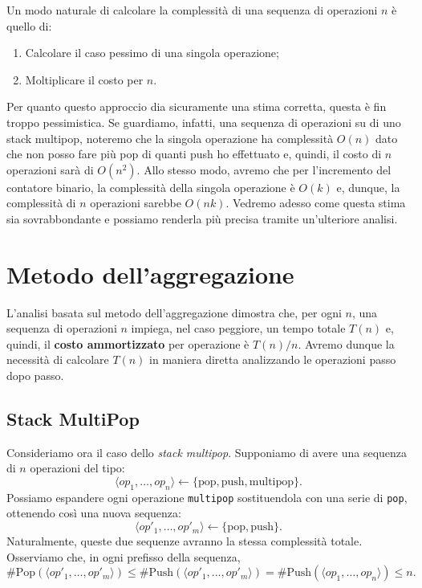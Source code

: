 Un modo naturale di calcolare la complessità di una sequenza di operazioni $n$ è quello di:
\begin{enumerate}
    \item Calcolare il caso pessimo di una singola operazione;
    \item Moltiplicare il costo per $n$.
\end{enumerate}
Per quanto questo approccio dia sicuramente una stima corretta, questa è fin troppo pessimistica. Se guardiamo, infatti, una sequenza di operazioni su di uno stack multipop, noteremo che la singola operazione ha complessità $O(n)$ dato che non posso fare più pop di quanti push ho effettuato e, quindi, il costo di $n$ operazioni sarà di $O(n^2)$. Allo stesso modo, avremo che per l'incremento del contatore binario, la complessità della singola operazione è $O(k)$ e, dunque, la complessità di $n$ operazioni sarebbe $O(nk)$. Vedremo adesso come questa stima sia sovrabbondante e possiamo renderla più precisa tramite un'ulteriore analisi.

\section{Metodo dell'aggregazione}
L'analisi basata sul metodo dell'aggregazione dimostra che, per ogni $n$, una sequenza di operazioni $n$ impiega, nel caso peggiore, un tempo totale $T(n)$ e, quindi, il \textbf{costo ammortizzato} per operazione è $T(n)/n$. Avremo dunque la necessità di calcolare $T(n)$ in maniera diretta analizzando le operazioni passo dopo passo.
\vspace{0.5em}
\subsection{Stack MultiPop}
Consideriamo ora il caso dello \textit{stack multipop}.  
Supponiamo di avere una sequenza di $n$ operazioni del tipo:
\[\langle op_1, \dots, op_n \rangle \xleftarrow{} \{\text{pop}, \text{push}, \text{multipop}\}.\]
Possiamo espandere ogni operazione \texttt{multipop} sostituendola con una serie di \texttt{pop}, ottenendo così una nuova sequenza:
\[\langle op'_1, \dots, op'_m \rangle \xleftarrow{} \{\text{pop}, \text{push}\}.\]
Naturalmente, queste due sequenze avranno la stessa complessità totale.  
Osserviamo che, in ogni prefisso della sequenza,
\[\#\text{Pop}(\langle op'_1, \dots, op'_m \rangle) \leq \#\text{Push}(\langle op'_1, \dots, op'_m \rangle)=\#\text{Push}(\langle op_1, \dots, op_n \rangle)\leq n.\]

